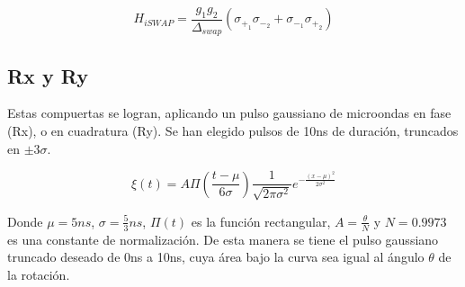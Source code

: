 \begin{equation}
    H_{iSWAP} = \frac{g_1 g_2}{\Delta_{swap}} (\sigma_{+_1} \sigma_{-_2} + \sigma_{-_1} \sigma_{+_2})
\end{equation}

\subsection{Rx y Ry}

Estas compuertas se logran, aplicando un pulso gaussiano de microondas en fase (Rx), o en cuadratura (Ry). Se han elegido pulsos de 10ns de duración, truncados en $\pm 3 \sigma$.

\begin{equation}
    \xi(t) = A \Pi\left(\frac{t-\mu}{6\sigma}\right) \frac{1}{\sqrt{2 \pi \sigma^2}} e^{-\frac{(x-\mu)^2}{2 \sigma^2}}
\end{equation}

Donde $\mu = 5ns$, $\sigma = \frac{5}{3} ns$, $\Pi(t)$ es la función rectangular, $A = \frac{\theta}{N}$ y $N = 0.9973$ es una constante de normalización. De esta manera se tiene el pulso gaussiano truncado deseado de 0ns a 10ns, cuya área bajo la curva sea igual al ángulo $\theta$ de la rotación.

